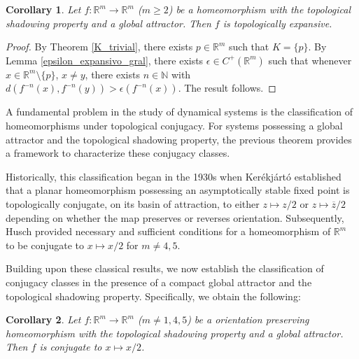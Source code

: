 \documentclass{amsart}
\newtheorem{clly}{Corollary}
\newcommand{\R}{{\mathbb{R}}}
\newcommand{\N}{{\mathbb{N}}}
\begin{document}
	\begin{clly}
		Let $f:\R^m\to \R^m$ ($m\geq 2$) be a homeomorphism with the topological shadowing property and a global attractor. 
		Then $f$ is topologically expansive.
	\end{clly}
	
	\begin{proof}
		By Theorem \ref{K_trivial}, there exists $p\in\R^m$ such that $K=\{p\}$. 
		By Lemma \ref{epsilon_expansivo_gral}, there exists $\epsilon\in C^+(\R^m)$ such that whenever $x\in \R^m\setminus\{p\}$, $x\neq y$, there exists $n\in \N$ with 
		$d(f^{-n}(x), f^{-n}(y))>\epsilon(f^{-n}(x))$. 
		The result follows.
	\end{proof}
	
	
A fundamental problem in the study of dynamical systems is the classification of homeomorphisms under topological conjugacy. For systems possessing a global attractor and the topological shadowing property, the previous theorem provides a framework to characterize these conjugacy classes.

Historically, this classification began in the 1930s when Kerékjártó \cite{Ke34} established that a planar homeomorphism possessing an asymptotically stable fixed point is topologically conjugate, on its basin of attraction, to either $z\mapsto z/2$ or $z\mapsto \overline{z}/2$ depending on whether the map preserves or reverses orientation. Subsequently, Husch \cite{Hu71} provided necessary and sufficient conditions for a homeomorphism of $\R^m$ to be conjugate to  $x\mapsto 
x/2$  for $m\neq4,5$. %

Building upon these classical results, we now establish the classification of conjugacy classes in the presence of a compact global attractor and the topological shadowing property. Specifically, we obtain the following:
	\begin{clly}
		Let $f:\R^m\to \R^m$ ($m\neq 1,4,5$) be a orientation preserving homeomorphism with the topological shadowing property and a global attractor. 
		Then $f$ is conjugate to  $x\mapsto x/2$.
	\end{clly}
	
\end{document}
